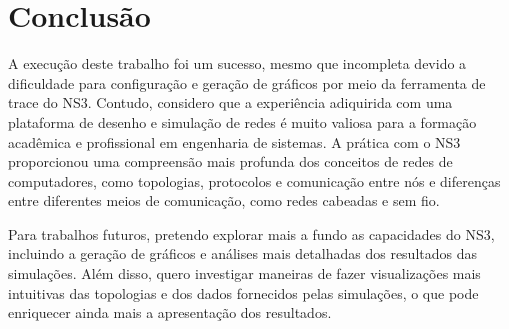 \documentclass[12pt,a4paper]{article}
\begin{document}
\section{Conclusão}

A execução deste trabalho foi um sucesso, mesmo que incompleta devido a dificuldade para configuração e geração de gráficos por meio da ferramenta de trace do NS3. Contudo, considero que a experiência adiquirida com uma plataforma de desenho e simulação de redes é muito valiosa para a formação acadêmica e profissional em engenharia de sistemas. A prática com o NS3 proporcionou uma compreensão mais profunda dos conceitos de redes de computadores, como topologias, protocolos e comunicação entre nós e diferenças entre diferentes meios de comunicação, como redes cabeadas e sem fio. 

Para trabalhos futuros, pretendo explorar mais a fundo as capacidades do NS3, incluindo a geração de gráficos e análises mais detalhadas dos resultados das simulações. Além disso, quero investigar maneiras de fazer visualizações mais intuitivas das topologias e dos dados fornecidos pelas simulações, o que pode enriquecer ainda mais a apresentação dos resultados. 

\clearpage
{}


\end{document}
